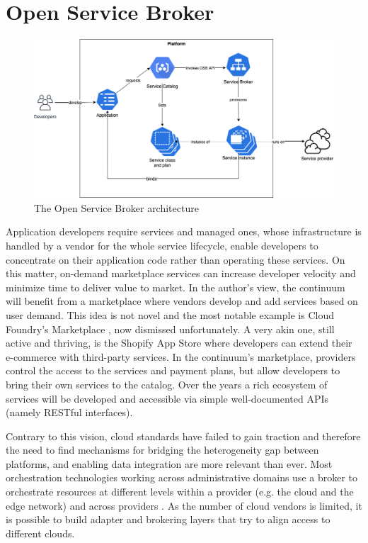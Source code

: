 \section{Open Service Broker}
\label{sec:osb}

\begin{figure}[h]
\centering
\includegraphics[width=\columnwidth]{figures/osb}
\caption{The Open Service Broker architecture \label{fig:osb}}
\end{figure}

Application developers require services and managed ones, whose infrastructure is handled by a vendor for the whole service lifecycle, enable developers to concentrate on their application code rather than operating these services. On this matter, on-demand marketplace services can increase developer velocity and minimize time to deliver value to market. In the author's view, the continuum will benefit from a marketplace where vendors develop and add services based on user demand. This idea is not novel and the most notable example is Cloud Foundry's Marketplace \cite{cloud-foundry-marketplace}, now dismissed unfortunately. A very akin one, still active and thriving, is the Shopify App Store \cite{shopify} where developers can extend their e-commerce with third-party services. In the continuum's marketplace, providers control the access to the services and payment plans, but allow developers to bring their own services to the catalog. Over the years a rich ecosystem of services will be developed and accessible via simple well-documented APIs (namely RESTful interfaces).

Contrary to this vision, cloud standards have failed to gain traction and therefore the need to find mechanisms for bridging the heterogeneity gap between platforms, and enabling data integration are more relevant than ever. Most orchestration technologies working across administrative domains use a broker to orchestrate resources at different levels within a provider (e.g. the cloud and the edge network) and across providers \cite{inter-cloud}. As the number of cloud vendors is limited, it is possible to build adapter and brokering layers that try to align access to different clouds. 

